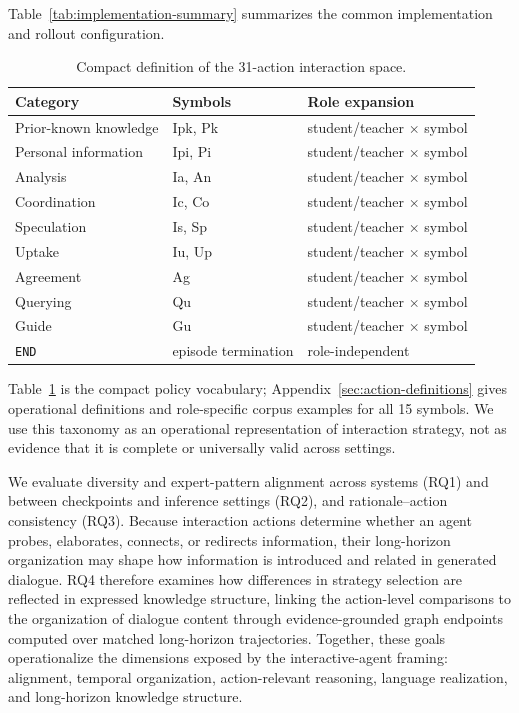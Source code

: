 \documentclass[manuscript,review,anonymous]{acmart}
\begin{document}
Table~\ref{tab:implementation-summary} summarizes the common implementation and
rollout configuration.

\begin{table}[t]
\centering
\small
\begin{tabularx}{\columnwidth}{@{}>{\raggedright\arraybackslash}X>{\raggedright\arraybackslash}X>{\raggedright\arraybackslash}X@{}}
\toprule
Category & Symbols & Role expansion \\
\midrule
Prior-known knowledge & Ipk, Pk & student/teacher $\times$ symbol \\
Personal information & Ipi, Pi & student/teacher $\times$ symbol \\
Analysis & Ia, An & student/teacher $\times$ symbol \\
Coordination & Ic, Co & student/teacher $\times$ symbol \\
Speculation & Is, Sp & student/teacher $\times$ symbol \\
Uptake & Iu, Up & student/teacher $\times$ symbol \\
Agreement & Ag & student/teacher $\times$ symbol \\
Querying & Qu & student/teacher $\times$ symbol \\
Guide & Gu & student/teacher $\times$ symbol \\
\texttt{END} & episode termination & role-independent \\
\bottomrule
\end{tabularx}
\caption{Compact definition of the 31-action interaction space.}
\label{tab:action-space}
\end{table}

Table~\ref{tab:action-space} is the compact policy vocabulary;
Appendix~\ref{sec:action-definitions} gives operational definitions and
role-specific corpus examples for all 15 symbols. We use this taxonomy as an
operational representation of interaction strategy, not as evidence that it
is complete or universally valid across settings.

We evaluate diversity and expert-pattern alignment across systems (RQ1)
and between checkpoints and inference settings (RQ2),
and rationale--action consistency (RQ3). Because interaction actions determine
whether an agent probes, elaborates, connects, or redirects information, their
long-horizon organization may shape how information is introduced and related
in generated dialogue. RQ4 therefore examines how differences in strategy
selection are reflected in expressed knowledge structure, linking the
action-level comparisons to the organization of dialogue content through
evidence-grounded graph endpoints computed over matched long-horizon
trajectories. Together, these goals operationalize the dimensions exposed by
the interactive-agent framing: alignment, temporal organization,
action-relevant reasoning, language realization, and long-horizon knowledge
structure.
\end{document}
